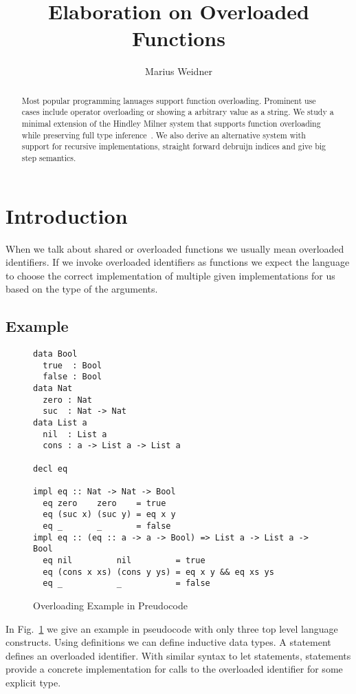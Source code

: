 \documentclass[runningheads]{llncs}
\newcommand{\snip}[1]{\footnotesize{\ttfamily{#1}}}
\begin{document}
\title{Elaboration on Overloaded Functions}
\author{Marius Weidner}
\maketitle

\begin{abstract}
Most popular programming lanuages support function overloading. Prominent use cases include operator overloading or showing a arbitrary value as a string. We study a minimal extension of the Hindley Milner system that supports function overloading while preserving full type inference~\cite{system-o}. We also derive an alternative system with support for recursive implementations, straight forward debruijn indices and give big step semantics.
\end{abstract}

\section{Introduction}
When we talk about shared or overloaded functions we usually mean overloaded identifiers. If we invoke overloaded identifiers as functions we expect the language to choose the correct implementation of multiple given implementations for us based on the type of the arguments.

\subsection{Example}
\begin{figure}
  \begin{lstlisting}
data Bool
  true  : Bool
  false : Bool
data Nat
  zero : Nat
  suc  : Nat -> Nat
data List a
  nil  : List a
  cons : a -> List a -> List a

decl eq

impl eq :: Nat -> Nat -> Bool
  eq zero    zero    = true
  eq (suc x) (suc y) = eq x y
  eq _       _       = false
impl eq :: (eq :: a -> a -> Bool) => List a -> List a -> Bool
  eq nil         nil         = true
  eq (cons x xs) (cons y ys) = eq x y && eq xs ys
  eq _           _           = false
  \end{lstlisting}
  \caption{Overloading Example in Preudocode} \label{example}
\end{figure}
\noindent In Fig.~\ref{example} we give an example in pseudocode with only three top level language constructs. Using \snip{data} definitions we can define inductive data types. A \snip{delc} statement defines an overloaded identifier. With similar syntax to let statements, \snip{impl} statements provide a concrete implementation for calls to the overloaded identifier for some explicit type. 
\end{document}
